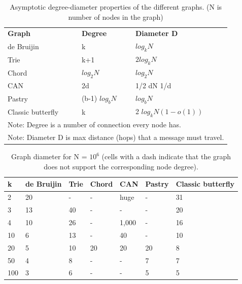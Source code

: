 \begin{table}[ht]
\centering
\caption{Asymptotic degree-diameter properties of the different graphs. (N is number of nodes in the graph)\cite{loguinov_graph-theoretic_2003}}
\label{structured-graph-performance}
\begin{tabular}{|l|l|l|}
\cline{1-3}
\textbf{Graph} & \textbf{Degree} & \textbf{Diameter D} \\ \cline{1-3}
de Bruijin & k & \(log_k N\) \\ \cline{1-3}
Trie & k+1 & \(2 log_k N\)  \\ \cline{1-3}
Chord & \(log_2 N\) & \(log_2 N\)  \\ \cline{1-3}
CAN & 2d & 1/2 dN 1/d \\ \cline{1-3}
Pastry & (b-1) \(log_b N\)  & \(log_b N\) \\ \cline{1-3}
Classic butterfly & k & 2 \(log_k N(1-o(1))\) \\ \cline{1-3}
\multicolumn{3}{|l|}{Note: Degree is a number of connection every node has.} \\ \hline
\multicolumn{3}{|l|}{Note: Diameter D is max distance (hops) that a message must travel.} \\ \hline
\end{tabular}
\end{table}

\begin{table}[ht]
\centering
\caption{Graph diameter for N = \(10^6\) (cells with a
dash indicate that the graph does not support the
corresponding node degree). \cite{loguinov_graph-theoretic_2003}}
\label{structured-graph-performance-2}
\begin{tabular}{|l|l|l|l|l|l|l|}
\hline
\textbf{k} & \textbf{de Bruijin} & \textbf{Trie} & \textbf{Chord} & \textbf{CAN} & \textbf{Pastry} & \textbf{Classic butterfly} \\ \hline
2 & 20 & - & - & huge & - & 31 \\ \hline
3 & 13 & 40 & - & - & - & 20 \\ \hline
4 & 10 & 26 & - & 1,000 & - & 16 \\ \hline
10 & 6 & 13 & - & 40 & - & 10 \\ \hline
20 & 5 & 10 & 20 & 20 & 20 & 8 \\ \hline
50 & 4 & 8 & - & - & 7 & 7 \\ \hline
100 & 3 & 6 & - & - & 5 & 5 \\ \hline
\end{tabular}
\end{table}

